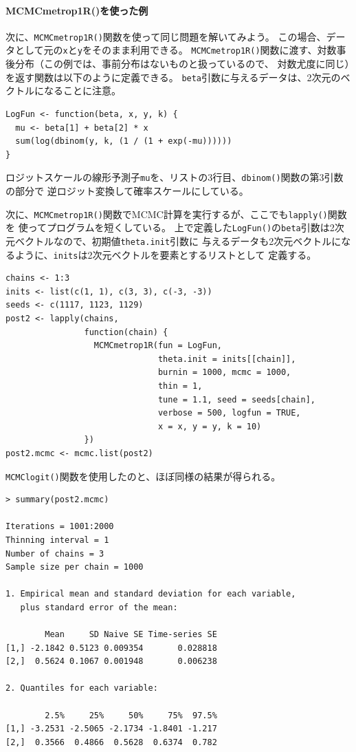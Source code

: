 \documentclass[11pt,uplatex]{jsarticle}
\begin{document}
\paragraph{MCMCmetrop1R()を使った例}

次に、\texttt{MCMCmetrop1R()}関数を使って同じ問題を解いてみよう。
この場合、データとして元の\texttt{x}と\texttt{y}をそのまま利用できる。
\texttt{MCMCmetrop1R()}関数に渡す、対数事後分布（この例では、事前分布はないものと扱っているので、
対数尤度に同じ）を返す関数は以下のように定義できる。
\texttt{beta}引数に与えるデータは、2次元のベクトルになることに注意。

\begin{lstlisting}
LogFun <- function(beta, x, y, k) {
  mu <- beta[1] + beta[2] * x
  sum(log(dbinom(y, k, (1 / (1 + exp(-mu))))))
}
\end{lstlisting}

\noindent
ロジットスケールの線形予測子\texttt{mu}を、リストの3行目、\texttt{dbinom()}関数の第3引数の部分で
逆ロジット変換して確率スケールにしている。

次に、\texttt{MCMCmetrop1R()}関数でMCMC計算を実行するが、ここでも\texttt{lapply()}関数を
使ってプログラムを短くしている。
上で定義した\texttt{LogFun()}の\texttt{beta}引数は2次元ベクトルなので、初期値\texttt{theta.init}引数に
与えるデータも2次元ベクトルになるように、\texttt{inits}は2次元ベクトルを要素とするリストとして
定義する。


\begin{lstlisting}
chains <- 1:3
inits <- list(c(1, 1), c(3, 3), c(-3, -3))
seeds <- c(1117, 1123, 1129)
post2 <- lapply(chains,
                function(chain) {
                  MCMCmetrop1R(fun = LogFun,
                               theta.init = inits[[chain]],
                               burnin = 1000, mcmc = 1000,
                               thin = 1,
                               tune = 1.1, seed = seeds[chain],
                               verbose = 500, logfun = TRUE,
                               x = x, y = y, k = 10)
                })
post2.mcmc <- mcmc.list(post2)
\end{lstlisting}

\texttt{MCMClogit()}関数を使用したのと、ほぼ同様の結果が得られる。

\begin{lstlisting}
> summary(post2.mcmc)

Iterations = 1001:2000
Thinning interval = 1 
Number of chains = 3 
Sample size per chain = 1000 

1. Empirical mean and standard deviation for each variable,
   plus standard error of the mean:

        Mean     SD Naive SE Time-series SE
[1,] -2.1842 0.5123 0.009354       0.028818
[2,]  0.5624 0.1067 0.001948       0.006238

2. Quantiles for each variable:

        2.5%     25%     50%     75%  97.5%
[1,] -3.2531 -2.5065 -2.1734 -1.8401 -1.217
[2,]  0.3566  0.4866  0.5628  0.6374  0.782
\end{lstlisting}
\end{document}
